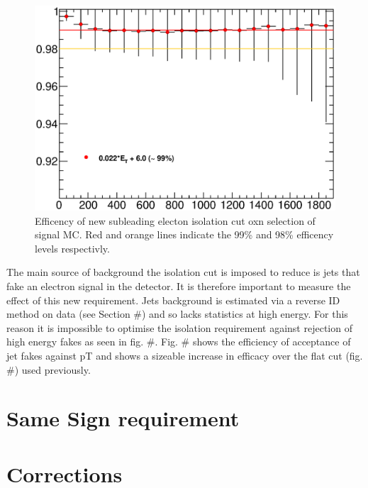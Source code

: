    \begin{figure}[h]
      \begin{center}
      \includegraphics[scale=0.6]{images/C5_sub_iso_efficiency.eps}
      \end{center}
   \caption{Efficency of new subleading electon isolation cut oxn selection of signal MC. Red and orange lines indicate the 99\% and 98\% efficency levels respectivly.}
   \label{fig:C5_sub_iso_efficiency}
   \end{figure}

The main source of background the isolation cut is imposed to reduce is jets that fake an electron signal in the detector. It is therefore important to measure the effect of this new requirement. Jets background is estimated via a reverse ID method on data (see Section \#) and so lacks statistics at high energy. For this reason it is impossible to optimise the isolation requirement against rejection of high energy fakes as seen in fig. \#. Fig. \# shows the efficiency of acceptance of jet fakes against pT and shows a sizeable increase in efficacy over the flat cut (fig. \#) used previously. 


\section{Same Sign requirement}

\section{Corrections}





\newpage
